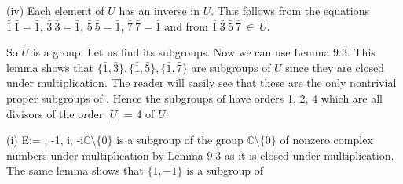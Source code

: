 \documentclass[11pt]{amsbook}
\begin{document}
\quad(iv) Each element of \(\mathit{U}\) has an inverse in \(\mathit{U}\). This follows from the equations \( \bar{1} \ \bar{1} = \bar{1} \), \( \bar{3} \ \bar{3} = \bar{1} \), \( \bar{5} \ \bar{5} = \bar{1} \), \( \bar{7} \ \bar{7} = \bar{1} \) and from \( \bar{1} \ \bar{3} \ \bar{5} \ \bar{7} \ \in \ \mathit{U}\).

So \(\mathit{U}\) is a group. Let us find its subgroups. Now we can use Lemma 9.3. This lemma shows that \( \lbrace \bar{1}, \bar{3}\rbrace,\lbrace \bar{1}, \bar{5}\rbrace, \lbrace \bar{1}, \bar{7}\rbrace\) are subgroups of \(\mathit{U}\) since they are closed under multiplication. The reader will easily see that these are the only nontrivial proper subgroups of . Hence the subgroups of  have orders 1, 2, 4 which are all divisors of the order \( \left| \mathit{U} \right| \) = 4 of \(\mathit{U}\). 


(i) E:= , -1, i, -i\rbrace \subseteq  \(\mathbb{C}\setminus \lbrace0\rbrace\) is a subgroup of the group \(\mathbb{C}\setminus \lbrace0\rbrace\) of nonzero complex numbers under multiplication by Lemma 9.3 as it is closed under multiplication. The same lemma shows that \( \lbrace1, -1\rbrace \) is a subgroup of

\end{document}
